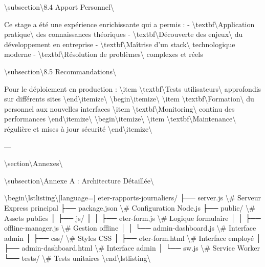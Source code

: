 \documentclass[12pt,a4paper]{report}
\begin{document}
\textbackslash{}subsection\textbackslash{}{8.4 Apport Personnel\textbackslash{}}

Ce stage a été une expérience enrichissante qui a permis :
- \textbackslash{}textbf\textbackslash{}{Application pratique\textbackslash{}} des connaissances théoriques
- \textbackslash{}textbf\textbackslash{}{Découverte des enjeux\textbackslash{}} du développement en entreprise
- \textbackslash{}textbf\textbackslash{}{Maîtrise d'un stack\textbackslash{}} technologique moderne
- \textbackslash{}textbf\textbackslash{}{Résolution de problèmes\textbackslash{}} complexes et réels

\textbackslash{}subsection\textbackslash{}{8.5 Recommandations\textbackslash{}}

Pour le déploiement en production :
\textbackslash{}item \textbackslash{}textbf\textbackslash{}{Tests utilisateurs\textbackslash{}} approfondis sur différents sites
\textbackslash{}end\textbackslash{}{itemize\textbackslash{}}
\textbackslash{}begin\textbackslash{}{itemize\textbackslash{}}
\textbackslash{}item \textbackslash{}textbf\textbackslash{}{Formation\textbackslash{}} du personnel aux nouvelles interfaces
\textbackslash{}item \textbackslash{}textbf\textbackslash{}{Monitoring\textbackslash{}} continu des performances
\textbackslash{}end\textbackslash{}{itemize\textbackslash{}}
\textbackslash{}begin\textbackslash{}{itemize\textbackslash{}}
\textbackslash{}item \textbackslash{}textbf\textbackslash{}{Maintenance\textbackslash{}} régulière et mises à jour sécurité
\textbackslash{}end\textbackslash{}{itemize\textbackslash{}}

---

\textbackslash{}section\textbackslash{}{Annexes\textbackslash{}}

\textbackslash{}subsection\textbackslash{}{Annexe A : Architecture Détaillée\textbackslash{}}

\textbackslash{}begin\textbackslash{}{lstlisting\textbackslash{}}[language=]
eter-rapports-journaliers/
├── server.js                    \textbackslash{}# Serveur Express principal
├── package.json                 \textbackslash{}# Configuration Node.js
├── public/                      \textbackslash{}# Assets publics
│   ├── js/
│   │   ├── eter-form.js        \textbackslash{}# Logique formulaire
│   │   ├── offline-manager.js  \textbackslash{}# Gestion offline
│   │   └── admin-dashboard.js  \textbackslash{}# Interface admin
│   ├── css/                    \textbackslash{}# Styles CSS
│   ├── eter-form.html          \textbackslash{}# Interface employé
│   ├── admin-dashboard.html    \textbackslash{}# Interface admin
│   └── sw.js                   \textbackslash{}# Service Worker
└── tests/                      \textbackslash{}# Tests unitaires
\textbackslash{}end\textbackslash{}{lstlisting\textbackslash{}}
\end{document}
